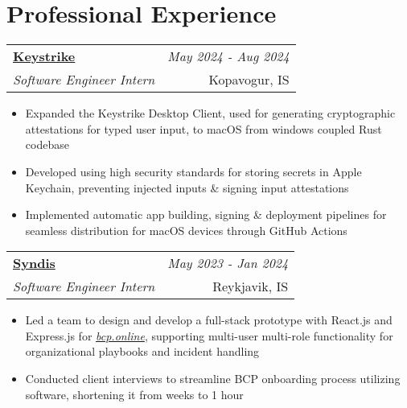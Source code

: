 \documentclass{article}
\makeatletter
\newcommand{\resumeSubheading}[4]{
\vspace{3mm}
    \begin{tabular*}{0.99\textwidth}[t]{l@{\extracolsep{\fill}}r}
		\textbf{\normalsize{#1}} & \textit{\normalsize{#4}} \\
        \textit{\normalsize{#3}} &  \normalsize{#2}\\
    \end{tabular*}
    \vspace{-2.5mm}
}
\newcommand{\resumeSubHeadingListStart}{}
\newcommand{\resumeItemListStart}{\begin{itemize}[leftmargin=*,labelsep=1mm,itemsep=-1.1mm]\normalsize}
\newcommand{\resumeItemListEnd}{\end{itemize}\vspace{-\baselineskip}}
\makeatother
\begin{document}
\section{\textbf{Professional Experience}}
  \resumeSubHeadingListStart


  \resumeSubheading
      {\href{https://keystrike.com}{Keystrike}}{Kopavogur, IS}
	  {Software Engineer Intern}{May 2024 - Aug 2024}
      \resumeItemListStart
	    \item Expanded the Keystrike Desktop Client, used for generating cryptographic attestations for typed user input, to macOS from windows coupled Rust codebase



		\item Developed using high security standards for storing secrets in Apple Keychain, preventing injected inputs \& signing input attestations

		\item Implemented automatic app building, signing \& deployment pipelines for seamless distribution for macOS devices through GitHub Actions 
      \resumeItemListEnd 

  \resumeSubheading
    {\href{https://www.syndis.is}{Syndis}}{Reykjavik, IS}
    {Software Engineer Intern}{May 2023 - Jan 2024}
    \resumeItemListStart
	  \item Led a team to design and develop a full-stack prototype with React.js and Express.js for \href{https://bcp.online}{\emph{bcp.online}}, supporting multi-user multi-role functionality for organizational playbooks and incident handling

	  \item Conducted client interviews to streamline BCP onboarding process utilizing software, shortening it from weeks to 1 hour
    \resumeItemListEnd
	
\end{document}
